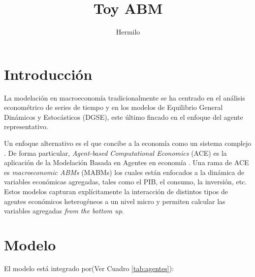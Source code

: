 \documentclass[12pt,a4paper]{article}
\author{Hermilo}
\title{Toy ABM}
\begin{document}
\sffamily
\maketitle

\section{Introducción}
La modelación en macroeconomía tradicionalmente se ha centrado en el análisis econométrico de series de tiempo y en los modelos de Equilibrio General Dinámicos y Estocásticos (DGSE), este último fincado en el enfoque del agente representativo.

Un enfoque alternativo es el que concibe a la economía como un sistema complejo \cite{colander2004changing}. De forma particular, \textit{Agent-based Computational Economics} (ACE) es la aplicación de la Modelación Basada en Agentes en economía \cite{tesfatsion2006agent}. Una rama de ACE es \textit{macroeconomic ABMs} (MABMs) los cuales están enfocados a la dinámica de variables económicas agregadas, tales como el PIB, el consumo, la inversión, etc. Estos modelos capturan explícitamente la interacción de distintos tipos de agentes económicos heterogéneos a un nivel micro y permiten calcular las variables agregadas \textit{from the bottom up}.

\section{Modelo}

El modelo está integrado por(Ver Cuadro \ref{tab:agentes}):
\end{document}
